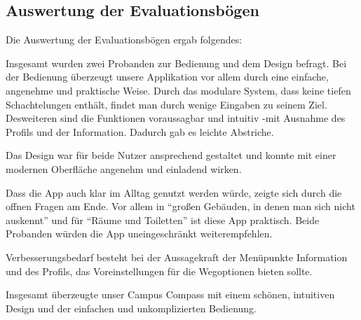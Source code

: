 \subsection*{Auswertung der Evaluationsbögen}

Die Auswertung der Evaluationsbögen ergab folgendes:

Insgesamt wurden zwei Probanden zur Bedienung und dem Design befragt. Bei der
Bedienung überzeugt unsere Applikation vor allem durch eine einfache, angenehme
und praktische Weise. Durch das modulare System, dass keine tiefen
Schachtelungen enthält, findet man durch wenige Eingaben zu seinem Ziel.
Desweiteren sind die Funktionen voraussagbar und intuitiv -mit Ausnahme des
Profils und der Information. Dadurch gab es leichte Abstriche.

Das Design war für beide Nutzer ansprechend gestaltet und konnte mit einer
modernen Oberfläche angenehm und einladend wirken.

Dass die App auch klar im Alltag genutzt werden würde, zeigte sich durch die
offnen Fragen am Ende. Vor allem in “großen Gebäuden, in denen man sich nicht
auskennt” und für “Räume und Toiletten” ist diese App praktisch. Beide Probanden
würden die App uneingeschränkt weiterempfehlen.

Verbesserungsbedarf besteht bei der Aussagekraft der Menüpunkte Information und
des Profils, das Voreinstellungen für die Wegoptionen bieten sollte.

Insgesamt überzeugte unser Campus Compass mit einem schönen, intuitiven Design
und der einfachen und unkomplizierten Bedienung.
